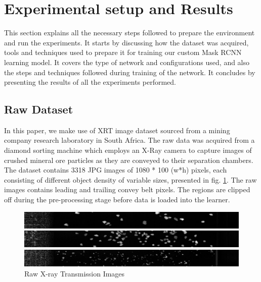 \documentclass[conference]{IEEEtran}
\begin{document}
\section{Experimental setup and Results}
	This section explains all the necessary steps followed to prepare the environment and run the experiments. It starts by discussing how the dataset was acquired, tools and
techniques used to prepare it for training our custom Mask RCNN learning model. It covers
the type of network and configurations used, and also the steps and techniques followed
during training of the network. It concludes by presenting the results of all the experiments performed.
	
	\subsection{Raw Dataset}
	
		In this paper, we make use of XRT image dataset sourced from a mining company research laboratory in South Africa. The raw data was acquired from a
diamond sorting machine which employs an X-Ray camera to capture images of crushed mineral ore particles as they are conveyed to their separation chambers. The dataset contains 3318 JPG images of 1080 * 100 (w*h) pixels, each consisting
of different object density of variable sizes, presented in fig. \ref{XRT Image}. The raw images contains leading and trailing convey belt pixels. The regions are clipped off during the pre-processing stage before data is loaded into the learner.

		\begin{figure}[htbp]
			\centering
			\includegraphics[width=1\linewidth]{scaled_CameraData20170505_150519_006199056_38672.jpg}
			
			\vspace{.1cm}
			
			\includegraphics[width=1\linewidth]{scaled_CameraData20170505_150519_006198940_38556.jpg}
			
			\vspace{.1cm}
			
			\includegraphics[width=1\linewidth]{scaled_CameraData20170505_131205_005799188_32020.jpg}
			\caption{ Raw X-ray Transmission Images}
			\label{XRT Image}
		\end{figure}
		
\end{document}
